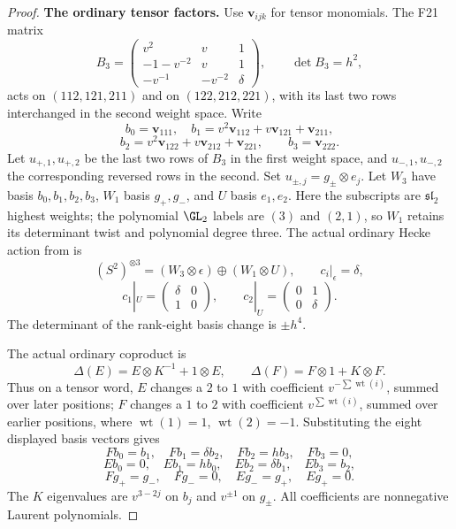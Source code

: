 \begin{proof}
\par\smallskip\noindent\textbf{The ordinary tensor factors.}\quad
Use $\mathbf v_{ijk}$ for tensor monomials. The F21 matrix
\[
 B_3=\begin{pmatrix}
 v^2&v&1\\-1-v^{-2}&v&1\\-v^{-1}&-v^{-2}&\delta
 \end{pmatrix},\qquad \det B_3=h^2,
\]
acts on $(112,121,211)$ and on $(122,212,221)$, with its last
two rows interchanged in the second weight space. Write
\[
 b_0=\mathbf v_{111},\quad
 b_1=v^2\mathbf v_{112}+v\mathbf v_{121}+\mathbf v_{211},
\]
\[
 b_2=v^2\mathbf v_{122}+v\mathbf v_{212}+\mathbf v_{221},
 \qquad b_3=\mathbf v_{222}.
\]
Let $u_{+,1},u_{+,2}$ be the last two rows of $B_3$ in the first
weight space, and $u_{-,1},u_{-,2}$ the corresponding reversed
rows in the second. Set $u_{\pm,j}=g_\pm\otimes e_j$.
Let $W_3$ have basis $b_0,b_1,b_2,b_3$, $W_1$ basis $g_+,g_-$,
and $U$ basis $e_1,e_2$.
Here the subscripts are $\mathfrak{sl}_2$ highest weights;
the polynomial $\GL_2$ labels are $(3)$ and $(2,1)$, so
$W_1$ retains its determinant twist and polynomial degree three.
The actual ordinary Hecke action from  is
\[
 (S^2)^{\otimes3}=(W_3\otimes\epsilon)\oplus(W_1\otimes U),
 \qquad c_i|_\epsilon=\delta,
\]
\[
 c_1|_U=\begin{pmatrix}\delta&0\\1&0\end{pmatrix},\qquad
 c_2|_U=\begin{pmatrix}0&1\\0&\delta\end{pmatrix}.
\]
The determinant of the rank-eight basis change is $\pm h^4$.

The actual ordinary coproduct is
\cite[\S4.1, equation~(29), p.~22]{IV}
\[
 \Delta(E)=E\otimes K^{-1}+1\otimes E,
 \qquad\Delta(F)=F\otimes1+K\otimes F.
\]
Thus on a tensor word, $E$ changes a $2$ to $1$ with coefficient
$v^{-\sum\operatorname{wt}(i)}$, summed over later positions;
$F$ changes a $1$ to $2$ with coefficient
$v^{\sum\operatorname{wt}(i)}$, summed over earlier positions,
where $\operatorname{wt}(1)=1$, $\operatorname{wt}(2)=-1$.
Substituting the eight displayed basis vectors gives
\[
 Fb_0=b_1,\quad Fb_1=\delta b_2,\quad Fb_2=hb_3,\quad Fb_3=0,
\]
\[
 Eb_0=0,\quad Eb_1=hb_0,\quad Eb_2=\delta b_1,\quad Eb_3=b_2,
\]
\[
 Fg_+=g_-,\quad Fg_-=0,\quad Eg_-=g_+,\quad Eg_+=0.
\]
The $K$ eigenvalues are $v^{3-2j}$ on $b_j$ and $v^{\pm1}$
on $g_\pm$. All coefficients are nonnegative Laurent polynomials.


\end{proof}
